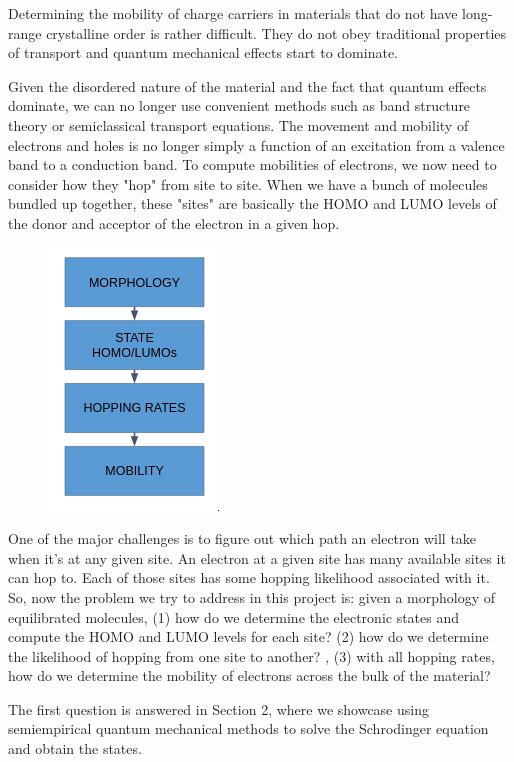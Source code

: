 \documentclass{article}
\begin{document}
Determining the mobility of charge carriers in materials that do not have long-range crystalline order is rather difficult. They do not obey traditional properties of transport and quantum mechanical effects start to dominate.

Given the disordered nature of the material and the fact that quantum effects dominate, we can no longer use convenient methods such as band structure theory or semiclassical transport equations. The movement and mobility of electrons and holes is no longer simply a function of an excitation from a valence band to a conduction band. To compute mobilities of electrons, we now need to consider how they "hop" from site to site. When we have a bunch of molecules bundled up together, these "sites" are basically the HOMO and LUMO levels of the donor and acceptor of the electron in a given hop.


\begin{figure}

    \centering
    \includegraphics[scale=0.8]{fig1}

\end{figure}


One of the major challenges is to figure out which path an electron will take when it's at any given site. An electron at a given site has many available sites it can hop to. Each of those sites has some hopping likelihood associated with it. So, now the problem we try to address in this project is: given a morphology of equilibrated molecules, (1) how do we determine the electronic states and compute the HOMO and LUMO levels for each site? (2) how do we determine the likelihood of hopping from one site to another? , (3) with all hopping rates, how do we determine the mobility of electrons across the bulk of the material?

The first question is answered in Section 2, where we showcase using semiempirical quantum mechanical methods to solve the Schrodinger equation and obtain the states.
\end{document}
